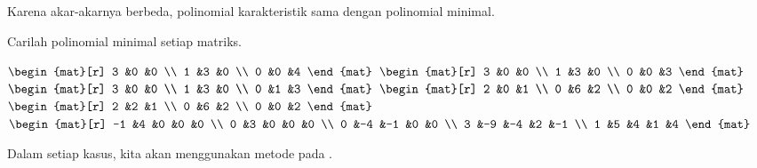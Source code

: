 \begin{exercises}
\begin{answer}
       Karena akar-akarnya berbeda, polinomial karakteristik sama dengan
       polinomial minimal.
     \end{answer}
  \recommended \item 
    Carilah polinomial minimal setiap matriks.
    \begin{exparts*}
       \partsitem \( \begin{mat}[r]
                   3  &0  &0  \\
                   1  &3  &0  \\
                   0  &0  &4
                \end{mat} \)
       \partsitem \( \begin{mat}[r]
                   3  &0  &0  \\
                   1  &3  &0  \\
                   0  &0  &3
                \end{mat} \)
       \partsitem \( \begin{mat}[r]
                   3  &0  &0  \\
                   1  &3  &0  \\
                   0  &1  &3
                \end{mat} \)
       \partsitem \( \begin{mat}[r]
                   2  &0  &1  \\
                   0  &6  &2  \\
                   0  &0  &2
                \end{mat} \)
       \partsitem \( \begin{mat}[r]
                   2  &2  &1  \\
                   0  &6  &2  \\
                   0  &0  &2
                \end{mat} \)
       \partsitem \( \begin{mat}[r]
                   -1 &4  &0  &0  &0  \\
                    0 &3  &0  &0  &0  \\
                    0 &-4 &-1 &0  &0  \\
                    3 &-9 &-4 &2  &-1 \\
                    1 &5  &4  &1  &4
                \end{mat} \)
    \end{exparts*}
    \begin{answer}
      Dalam setiap kasus, kita akan menggunakan metode pada .

\end{answer}
\end{exercises}
